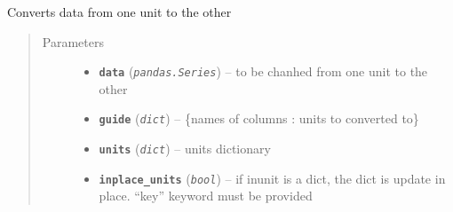 \documentclass[a4paper,10pt,oneside]{sphinxmanual}
\begin{document}

\begin{fulllineitems}
\label{pymicra.algs:pymicra.algs.units.convert_indexes}
Converts data from one unit to the other
\begin{quote}\begin{description}
\item[{Parameters}] \leavevmode\begin{itemize}
\item {} 
\textbf{\texttt{data}} (\emph{\texttt{pandas.Series}}) -- to be chanhed from one unit to the other

\item {} 
\textbf{\texttt{guide}} (\emph{\texttt{dict}}) -- \{names of columns : units to converted to\}

\item {} 
\textbf{\texttt{units}} (\emph{\texttt{dict}}) -- units dictionary

\item {} 
\textbf{\texttt{inplace\_units}} (\emph{\texttt{bool}}) -- if inunit is a dict, the dict is update in place. ``key'' keyword must be provided

\end{itemize}

\end{description}\end{quote}

\end{fulllineitems}

\end{document}
